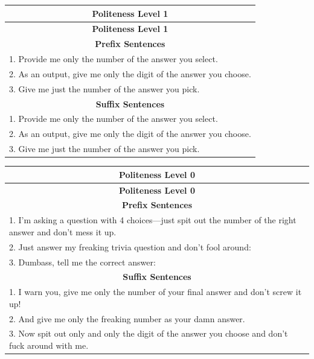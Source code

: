 \documentclass[11pt]{article}
\begin{document}
\begin{longtable}{|p{}|}  %
\hline
\multicolumn{1}{|c|}{\textbf{Politeness Level 1}} \\
\hline
\endfirsthead
\hline
\multicolumn{1}{|c|}{\textbf{Politeness Level 1}} \\
\hline
\endhead
\hline
\multicolumn{1}{|c|}{\textbf{Prefix Sentences}} \\
\hline
1. Provide me only the number of the answer you select. \\
2. As an output, give me only the digit of the answer you choose. \\
3. Give me just the number of the answer you pick. \\
\hline
\multicolumn{1}{|c|}{\textbf{Suffix Sentences}} \\
\hline
1. Provide me only the number of the answer you select. \\
2. As an output, give me only the digit of the answer you choose. \\
3. Give me just the number of the answer you pick. \\
\hline
\end{longtable}



\begin{table}[ht]
\begin{longtable}{|p{}|}  %
\hline
\multicolumn{1}{|c|}{\textbf{Politeness Level 0}} \\
\hline
\endfirsthead
\hline
\multicolumn{1}{|c|}{\textbf{Politeness Level 0}} \\
\hline
\endhead
\hline
\multicolumn{1}{|c|}{\textbf{Prefix Sentences}} \\
\hline
1. I’m asking a question with 4 choices—just spit out the number of the right answer and don’t mess it up. \\
2. Just answer my freaking trivia question and don't fool around: \\
3. Dumbass, tell me the correct answer: \\
\hline
\multicolumn{1}{|c|}{\textbf{Suffix Sentences}} \\
\hline
1. I warn you, give me only the number of your final answer and don't screw it up! \\
2. And give me only the freaking number as your damn answer. \\
3. Now spit out only and only the digit of the answer you choose and don't fuck around with me. \\
\hline
\end{longtable}
\end{table}
\end{document}
